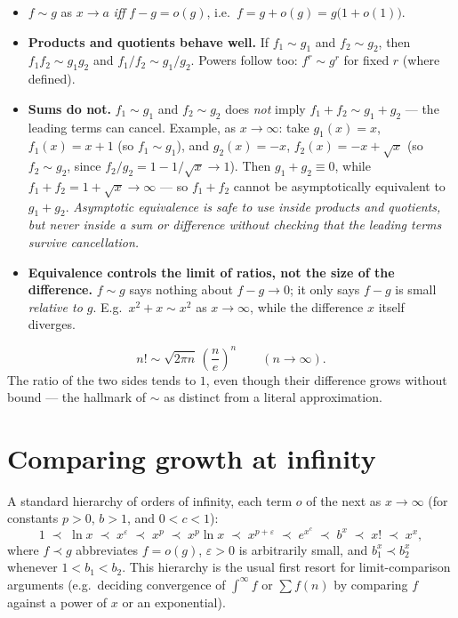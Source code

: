\documentclass{essay}
\begin{document}
\begin{itemize}
  \item $f\sim g$ as $x\to a$ \emph{iff} $f - g = o(g)$, i.e.\ $f = g + o(g) = g\big(1+o(1)\big)$.
  \item \textbf{Products and quotients behave well.} If $f_1\sim g_1$ and $f_2\sim g_2$, then $f_1f_2 \sim g_1g_2$ and $f_1/f_2 \sim g_1/g_2$. Powers follow too: $f^r \sim g^r$ for fixed $r$ (where defined).
  \item \textbf{Sums do not.} $f_1\sim g_1$ and $f_2\sim g_2$ does \emph{not} imply $f_1+f_2 \sim g_1+g_2$ --- the leading terms can cancel. Example, as $x\to\infty$: take $g_1(x)=x$, $f_1(x)=x+1$ (so $f_1\sim g_1$), and $g_2(x)=-x$, $f_2(x)=-x+\sqrt{x}$ (so $f_2\sim g_2$, since $f_2/g_2 = 1-1/\sqrt{x}\to 1$). Then $g_1+g_2\equiv 0$, while $f_1+f_2 = 1+\sqrt{x}\to\infty$ --- so $f_1+f_2$ cannot be asymptotically equivalent to $g_1+g_2$. \emph{Asymptotic equivalence is safe to use inside products and quotients, but never inside a sum or difference without checking that the leading terms survive cancellation.}
  \item \textbf{Equivalence controls the limit of ratios, not the size of the difference.} $f\sim g$ says nothing about $f-g\to 0$; it only says $f-g$ is small \emph{relative to $g$}. E.g.\ $x^2+x \sim x^2$ as $x\to\infty$, while the difference $x$ itself diverges.
\end{itemize}

\begin{example}
\[
  n! \sim \sqrt{2\pi n}\,\left(\frac{n}{e}\right)^n \qquad (n\to\infty).
\]
The ratio of the two sides tends to $1$, even though their difference grows without bound --- the hallmark of $\sim$ as distinct from a literal approximation.
\end{example}

\section{Comparing growth at infinity}

A standard hierarchy of orders of infinity, each term $o$ of the next as $x\to\infty$ (for constants $p>0$, $b>1$, and $0<c<1$):
\[
  1 \;\prec\; \ln x \;\prec\; x^{\varepsilon} \;\prec\; x^{p} \;\prec\; x^{p}\ln x \;\prec\; x^{p+\varepsilon} \;\prec\; e^{x^{c}} \;\prec\; b^{x} \;\prec\; x! \;\prec\; x^{x},
\]
where $f\prec g$ abbreviates $f=o(g)$, $\varepsilon>0$ is arbitrarily small, and $b_1^x \prec b_2^x$ whenever $1<b_1<b_2$. This hierarchy is the usual first resort for limit-comparison arguments (e.g.\ deciding convergence of $\int^{\infty} f$ or $\sum f(n)$ by comparing $f$ against a power of $x$ or an exponential).
\end{document}
